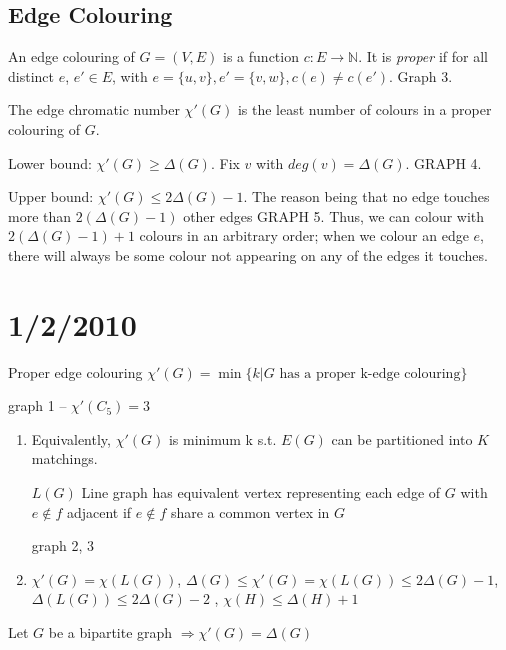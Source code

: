 \documentclass{article}
\begin{document}
\subsection*{Edge Colouring}

\begin{rec}
An edge colouring of $G=(V,E)$ is a function $c:E \rightarrow \mathbb{N}$.  It is \emph{proper} if for all distinct $e$, $e' \in E$, with $e=\{u,v\}, e'=\{v,w\}, c(e) \neq c(e')$.  Graph 3.
\end{rec}

The edge chromatic number $\chi'(G)$ is the least number of colours in a proper colouring of $G$.

Lower bound: $\chi'(G) \geq \Delta(G)$.  Fix $v$ with $deg(v) = \Delta(G)$.  GRAPH 4.

Upper bound: $\chi'(G) \leq 2 \Delta(G)-1$.  The reason being that no edge touches more than $2(\Delta(G)-1)$ other edges GRAPH 5.  Thus, we can colour with $2 (\Delta(G)-1) +1$ colours in an arbitrary order; when we colour an edge $e$, there will always be some colour not appearing on any of the edges it touches.

\section*{1/2/2010}
Proper edge colouring $\chi'(G)=\min\{k| G \text{ has a proper k-edge colouring}\}$

graph 1 -- $\chi'(C_5)=3$

\begin{rem}
\begin{enumerate}
\item Equivalently, $\chi'(G)$ is minimum k s.t. $E(G)$ can be partitioned into $K$ matchings.

$L(G)$ Line graph has equivalent vertex representing each edge of $G$ with $e \notin f$ adjacent if $e \notin f$ share a common vertex in $G$

graph 2, 3

\item $\chi'(G)=\chi(L(G))$, $\Delta(G) \le \chi'(G) = \chi(L(G)) \le 2\Delta(G)-1$, $\Delta(L(G)) \le 2\Delta(G) -2$ , $\chi(H) \le \Delta(H) +1$
\end{enumerate}
\end{rem}

\begin{prop}
Let $G$ be a bipartite graph $\Rightarrow \chi'(G) = \Delta(G)$
\end{prop}
\end{document}
